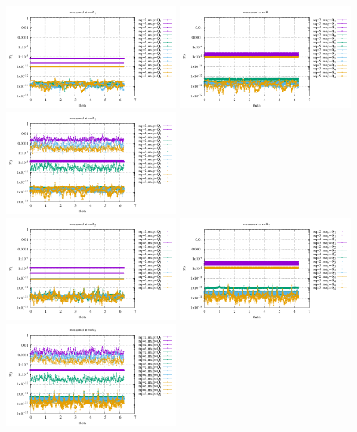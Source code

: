 \begin{center}
\includegraphics[width=5.7cm]{python_codes/fieldstone_152/results/exp1/sr1_R1}
\includegraphics[width=5.7cm]{python_codes/fieldstone_152/results/exp1/sr2_R1}
\includegraphics[width=5.7cm]{python_codes/fieldstone_152/results/exp1/sr3_R1}\\
\includegraphics[width=5.7cm]{python_codes/fieldstone_152/results/exp1/sr1_R2}
\includegraphics[width=5.7cm]{python_codes/fieldstone_152/results/exp1/sr2_R2}
\includegraphics[width=5.7cm]{python_codes/fieldstone_152/results/exp1/sr3_R2}\\
\end{center}

